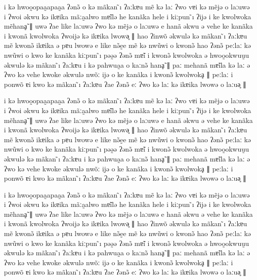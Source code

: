 \documentclass{article}
\newcommand\ipaipsum{i kə hwoo̰opaa̰apaa̰a ʔənə̃ o kə mãkan ̃ı ʔaːkɐu mẽ kə laː ʔwo vɐi kə mẽjə o laːuwə i ʔwoi əkwu kə ikɐika mãːa̰alwo mɐ̃ilə he kanãka hele i kiːpun ̃ı ʔijə i ke kwolwoka mẽhanḁ̃ ∥ uwə ʔae like laːuwə ʔwo kə mẽjə o laːuwə e hanã əkwu ə vehe ke kanãka i kwonã kwolwoka ʔwoijə kə ikɐika lwowə̥ ∥ hao ʔinwõ əkwulə kə mãkan ̃ı ʔaːkɐu mẽ kwonə̃ ikɐika ə pɐu lwowə e like nə̃ḛe mẽ kə nwũwi o kwonə̃ hao ʔənə̃ peːlaː kə nwũwi o kwo ke kanãka kiːpun ̃ı pəə̰ə ʔənə̃ mɐ̃i i kwonə̃ kwolwoka ə hwoo̰okwuṵu əkwulə kə mãkan ̃ı ʔaːkɐu i kə pahwua̰a o kaːnə̃ hanḁ̃ ∥ paː mehanã mɐ̃ila kə laː ə
ʔwo kə vehe kwoke əkwulə nwõː ijə o ke kanãka i kwonə̃ kwolwokḁ ∥ peːlaː i ponwõ ɐi kwo kə mãkan ̃ı ʔaːkɐu ʔae ʔənə̃ eː ʔwo kə laː kə ikɐika lwowə o laːuə̥ ∥}
\begin{document}
\judson

\ipaipsum{}

\voces

\ipaipsum{}

\tinos

\ipaipsum{}
\end{document}

